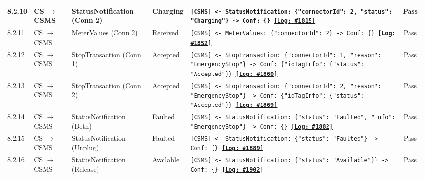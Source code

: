 \documentclass[10pt, a4paper, landscape]{article}
\begin{document}
\begin{longtable}{|p{1.0cm}|p{2.5cm}|p{4.0cm}|p{5.0cm}|p{10.0cm}|c|}
\hline
8.2.10 & CS $\to$ CSMS & StatusNotification (Conn 2) & Charging & \footnotesize\texttt{[CSMS] <- StatusNotification: \{"connectorId": 2, "status": "Charging"\} \newline [CSMS] -> Conf: \{\} \newline \hyperref[log:8.2.10]{\textbf{[Log: \#1815]}}} & Pass \\
\hline
8.2.11 & CS $\to$ CSMS & MeterValues (Conn 2) & Received & \footnotesize\texttt{[CSMS] <- MeterValues: \{"connectorId": 2\} \newline [CSMS] -> Conf: \{\} \newline \hyperref[log:8.2.11]{\textbf{[Log: \#1852]}}} & Pass \\
\hline
8.2.12 & CS $\to$ CSMS & StopTransaction (Conn 1) & Accepted & \footnotesize\texttt{[CSMS] <- StopTransaction: \{"connectorId": 1, "reason": "EmergencyStop"\} \newline [CSMS] -> Conf: \{"idTagInfo": \{"status": "Accepted"\}\} \newline \hyperref[log:8.2.12]{\textbf{[Log: \#1860]}}} & Pass \\
\hline
8.2.13 & CS $\to$ CSMS & StopTransaction (Conn 2) & Accepted & \footnotesize\texttt{[CSMS] <- StopTransaction: \{"connectorId": 2, "reason": "EmergencyStop"\} \newline [CSMS] -> Conf: \{"idTagInfo": \{"status": "Accepted"\}\} \newline \hyperref[log:8.2.13]{\textbf{[Log: \#1869]}}} & Pass \\
\hline
8.2.14 & CS $\to$ CSMS & StatusNotification (Both) & Faulted & \footnotesize\texttt{[CSMS] <- StatusNotification: \{"status": "Faulted", "info": "EmergencyStop"\} \newline [CSMS] -> Conf: \{\} \newline \hyperref[log:8.2.14]{\textbf{[Log: \#1882]}}} & Pass \\
\hline
8.2.15 & CS $\to$ CSMS & StatusNotification (Unplug) & Faulted & \footnotesize\texttt{[CSMS] <- StatusNotification: \{"status": "Faulted"\} \newline [CSMS] -> Conf: \{\} \newline \hyperref[log:8.2.15]{\textbf{[Log: \#1889]}}} & Pass \\
\hline
8.2.16 & CS $\to$ CSMS & StatusNotification (Release) & Available & \footnotesize\texttt{[CSMS] <- StatusNotification: \{"status": "Available"\}\} \newline [CSMS] -> Conf: \{\} \newline \hyperref[log:8.2.16]{\textbf{[Log: \#1902]}}} & Pass \\

\end{longtable}
\end{document}
